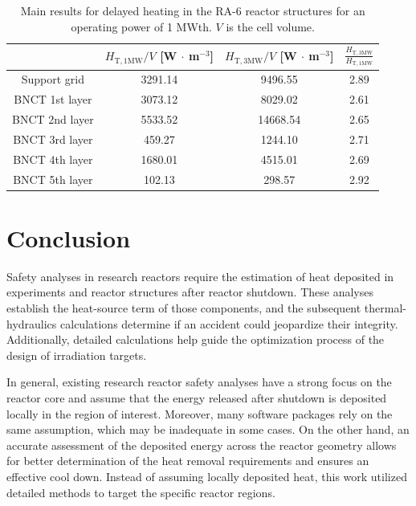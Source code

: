 \documentclass{style/nseJournal}
\begin{document}
\begin{table}[htbp!]
  \centering
  \caption{Main results for delayed heating in the RA-6 reactor structures for an operating power of 1 MWth. $V$ is the cell volume.}
  \label{tab:ra6-res}
  \begin{tabular}{cccc}
    \toprule
                    & $H_{\mathrm{T, 1MW}}/V$ [W $\cdot$ m$^{-3}$]  & $H_{\mathrm{T, 3MW}}/V$ [W $\cdot$ m$^{-3}$]  & $\frac{ H_{\mathrm{T, 3MW}} }{ H_{\mathrm{T, 1MW}} }$  \\
    \midrule
    Support grid    &  3291.14                &  9496.55                &  2.89    \\
    BNCT 1st layer  &  3073.12                &  8029.02                &  2.61    \\
    BNCT 2nd layer  &  5533.52                & 14668.54                &  2.65    \\
    BNCT 3rd layer  &   459.27                &  1244.10                &  2.71    \\
    BNCT 4th layer  &  1680.01                &  4515.01                &  2.69    \\
    BNCT 5th layer  &   102.13                &  298.57                 &  2.92    \\
    \bottomrule
  \end{tabular}
\end{table}


\section{Conclusion}
\label{sec:conclusion}

Safety analyses in research reactors require the estimation of heat deposited in experiments and reactor structures after reactor shutdown.
These analyses establish the heat-source term of those components, and the subsequent thermal-hydraulics calculations determine if an accident could jeopardize their integrity.
Additionally, detailed calculations help guide the optimization process of the design of irradiation targets.

In general, existing research reactor safety analyses have a strong focus on the reactor core and assume that the energy released after shutdown is deposited locally in the region of interest.
Moreover, many software packages rely on the same assumption, which may be inadequate in some cases.
On the other hand, an accurate assessment of the deposited energy across the reactor geometry allows for better determination of the heat removal requirements and ensures an effective cool down.
Instead of assuming locally deposited heat, this work utilized detailed methods to target the specific reactor regions.
\end{document}
